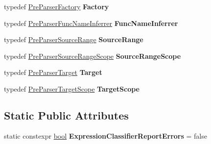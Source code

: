 \begin{DoxyCompactItemize}
\item 
\mbox{\label{structv8_1_1internal_1_1ParserTypes_3_01PreParser_01_4_a97c12076036709060eda79d5934c1797}} 
typedef \mbox{\hyperlink{classv8_1_1internal_1_1PreParserFactory}{Pre\+Parser\+Factory}} {\bfseries Factory}
\item 
\mbox{\label{structv8_1_1internal_1_1ParserTypes_3_01PreParser_01_4_a6c716e506f7b2d7cbe7bd9ac6f74cc93}} 
typedef \mbox{\hyperlink{classv8_1_1internal_1_1PreParserFuncNameInferrer}{Pre\+Parser\+Func\+Name\+Inferrer}} {\bfseries Func\+Name\+Inferrer}
\item 
\mbox{\label{structv8_1_1internal_1_1ParserTypes_3_01PreParser_01_4_aea31a987c83627cb0674a1472f7db2a4}} 
typedef \mbox{\hyperlink{classv8_1_1internal_1_1PreParserSourceRange}{Pre\+Parser\+Source\+Range}} {\bfseries Source\+Range}
\item 
\mbox{\label{structv8_1_1internal_1_1ParserTypes_3_01PreParser_01_4_ad69333f876bc483c8adf95665b947590}} 
typedef \mbox{\hyperlink{classv8_1_1internal_1_1PreParserSourceRangeScope}{Pre\+Parser\+Source\+Range\+Scope}} {\bfseries Source\+Range\+Scope}
\item 
\mbox{\label{structv8_1_1internal_1_1ParserTypes_3_01PreParser_01_4_a792c6f4f270b9209a9f147ec0068c997}} 
typedef \mbox{\hyperlink{classv8_1_1internal_1_1PreParserTarget}{Pre\+Parser\+Target}} {\bfseries Target}
\item 
\mbox{\label{structv8_1_1internal_1_1ParserTypes_3_01PreParser_01_4_a451a173630525f5b857023f0bf6adc0d}} 
typedef \mbox{\hyperlink{classv8_1_1internal_1_1PreParserTargetScope}{Pre\+Parser\+Target\+Scope}} {\bfseries Target\+Scope}
\end{DoxyCompactItemize}
\subsection*{Static Public Attributes}
\begin{DoxyCompactItemize}
\item 
\mbox{\label{structv8_1_1internal_1_1ParserTypes_3_01PreParser_01_4_a7de644ad1133b81210ac261f492985b2}} 
static constexpr \mbox{\hyperlink{classbool}{bool}} {\bfseries Expression\+Classifier\+Report\+Errors} = false
\end{DoxyCompactItemize}


